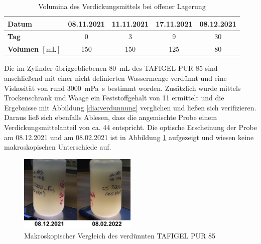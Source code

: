 \begin{table}[h!]
	\renewcommand*{\arraystretch}{1.2}
	\centering
	\caption{Volumina des Verdickungsmittels bei offener Lagerung}
	\label{tab:lagerung}
		\begin{tabulary}{1.0\textwidth}{L|C|C|C|C}
			\hline
			\textbf{Datum} & 08.11.2021 & 11.11.2021 & 17.11.2021 & 08.12.2021\\
			\hline
			\textbf{Tag}&0&3&9&30\\
			\hline
			\textbf{Volumen $\left[\si{\milli \liter}\right]$}&150&150&125&80\\
			\hline			
	\end{tabulary}
\end{table}%
\FloatBarrier


Die im Zylinder übriggebliebenen \SI{80}{\milli \liter} des TAFIGEL PUR 85 sind anschließend mit einer nicht definierten Wassermenge verdünnt und eine Viskosität von rund \SI{3000}{\milli \pascal \second} bestimmt worden. Zusätzlich wurde mittels Trockenschrank und Waage ein Feststoffgehalt von \SI{11}{\mpercent} ermittelt und die Ergebnisse mit Abbildung \ref{dia:verdunnung} verglichen und ließen sich verifizieren. Daraus ließ sich ebenfalls Ablesen, dass die angemischte Probe einem Verdickungsmittelanteil von ca. \SI{44}{\mpercent} entspricht. Die optische Erscheinung der Probe am 08.12.2021 und am 08.02.2021 ist in Abbildung \ref{fig:lagerung2} aufgezeigt und wiesen keine makroskopischen Unterschiede auf.

\begin{figure}[h!]
	\centering
	\includegraphics[width=0.5\textwidth]{img/lagerung2}
	\caption{Makroskopischer Vergleich des verdünnten TAFIGEL PUR 85}
	\label{fig:lagerung2}
\end{figure}
\FloatBarrier

